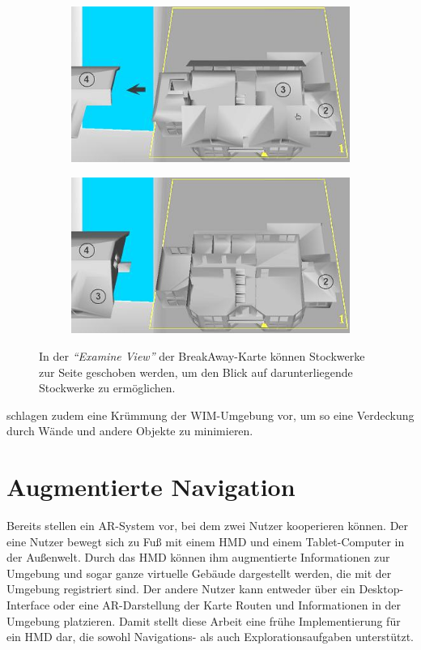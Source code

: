 \begin{figure}
    \begin{subfigure}{.49\textwidth}
        \includegraphics[width=\textwidth]{figures/chittaro2005_breakaway_a.png}
    \end{subfigure}
    \hfill
    \begin{subfigure}{.49\textwidth}
        \includegraphics[width=\textwidth]{figures/chittaro2005_breakaway_b.png}
    \end{subfigure}
    \caption{In der \emph{\enquote{Examine View}} der BreakAway-Karte können Stockwerke zur Seite geschoben werden, um den Blick auf darunterliegende Stockwerke zu ermöglichen.}
    \label{fig:chittaro2005_breakaway}
\end{figure}

\textcite{Vallance2001} schlagen zudem eine Krümmung der WIM-Umgebung vor, um so eine Verdeckung durch Wände und andere Objekte zu minimieren.


\section{Augmentierte Navigation}
Bereits \textcite{Hoellerer1999} stellen ein AR-System vor, bei dem zwei Nutzer kooperieren können.
Der eine Nutzer bewegt sich zu Fuß mit einem HMD und einem Tablet-Computer in der Außenwelt.
Durch das HMD können ihm augmentierte Informationen zur Umgebung und sogar ganze virtuelle Gebäude dargestellt werden, die mit der Umgebung registriert sind.
Der andere Nutzer kann entweder über ein Desktop-Interface oder eine AR-Darstellung der Karte Routen und Informationen in der Umgebung platzieren.
Damit stellt diese Arbeit eine frühe Implementierung für ein HMD dar, die sowohl Navigations- als auch Explorationsaufgaben unterstützt.

